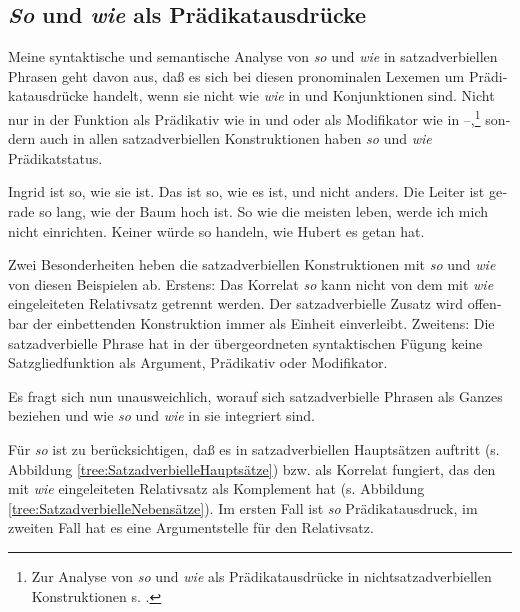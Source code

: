 \documentclass[output=paper, colorlinks, citecolor=brown, booklanguage=german]{langscibook}
\begin{document}
\begin{otherlanguage}{german}
\subsection{\textit{So} und \textit{wie} als Prädikatausdrücke} \label{sec:zi97:2.5}

Meine syntaktische und semantische Analyse von \textit{so} und \textit{wie} in satzadverbiellen Phrasen geht davon aus, daß es sich bei diesen pronominalen Lexemen um Prädikatausdrücke handelt, wenn sie nicht wie \textit{wie} in  und  Konjunktionen sind. Nicht nur in der Funktion als Prädikativ wie in  und  oder als Modifikator wie in --,\footnote{Zur Analyse von \textit{so} und \textit{wie} als Prädikatausdrücke in nichtsatzadverbiellen Konstruktionen s. \citet{zimmermann1987zursyntaxvonkomparationskonstruktionen, zimmermann1991diesubordinierendekonjunktionwie, zimmermann1992derskopusvonmodifikatoren, zimmermann1995bausteine}.} sondern auch in allen satzadverbiellen Konstruktionen haben \textit{so} und \textit{wie} Prädikatstatus.

\ea Ingrid ist so, wie sie ist. \label{ex:zi97:34}
\ex Das ist so, wie es ist, und nicht anders. \label{ex:zi97:35}
\ex Die Leiter ist gerade so lang, wie der Baum hoch ist. \label{ex:zi97:36}
\ex So wie die meisten leben, werde ich mich nicht einrichten. \label{ex:zi97:37}
\ex Keiner würde so handeln, wie Hubert es getan hat. \label{ex:zi97:38}
\z

\noindent Zwei Besonderheiten heben die satzadverbiellen Konstruktionen mit \textit{so} und \textit{wie} von diesen Beispielen ab. Erstens: Das Korrelat \textit{so} kann nicht von dem mit \textit{wie} eingeleiteten Relativsatz getrennt werden. Der satzadverbielle Zusatz wird offenbar der einbettenden Konstruktion immer als Einheit einverleibt. Zweitens: Die satzadverbielle Phrase hat in der übergeordneten syntaktischen Fügung keine Satzgliedfunktion als Argument, Prädikativ oder Modifikator.

Es fragt sich nun unausweichlich, worauf sich satzadverbielle Phrasen als Ganzes beziehen und wie \textit{so} und \textit{wie} in sie integriert sind.

Für \textit{so} ist zu berücksichtigen, daß es in satzadverbiellen Hauptsätzen auftritt (s. Abbildung \ref{tree:SatzadverbielleHauptsätze}) bzw. als Korrelat fungiert, das den mit \textit{wie} eingeleiteten Relativsatz als Komplement hat (s. Abbildung \ref{tree:SatzadverbielleNebensätze}). Im ersten Fall ist \textit{so} Prädikatausdruck, im zweiten Fall hat es eine Argumentstelle für den Relativsatz.


\end{otherlanguage}
\end{document}
